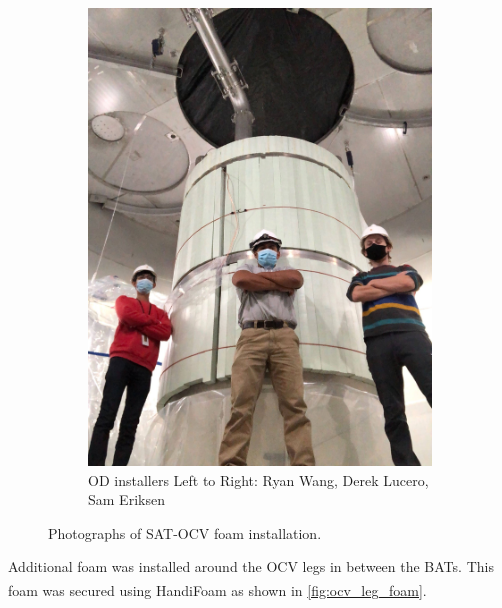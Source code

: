 \begin{figure}[!tbph]
\begin{subfigure}{.5\textwidth}
  \includegraphics[width=\linewidth]{Figures/Construction/SAT_foam_fittest.jpg}
  \caption{OD installers Left to Right: Ryan Wang, Derek Lucero, Sam Eriksen}
  \label{fig:SAT_foam_guys}
  \end{subfigure}
\caption{Photographs of SAT-OCV foam installation.}
\label{fig:SAT_foam_installation}
\end{figure}

\par
Additional foam was installed around the OCV legs in between the BATs.
This foam was secured using HandiFoam\textsuperscript{\textregistered} as shown in \autoref{fig:ocv_leg_foam}.

